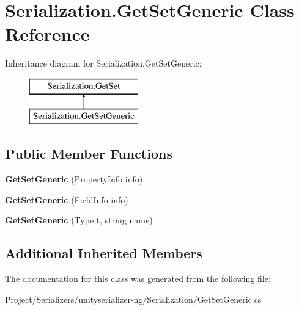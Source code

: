 \hypertarget{class_serialization_1_1_get_set_generic}{}\section{Serialization.\+Get\+Set\+Generic Class Reference}
\label{class_serialization_1_1_get_set_generic}
Inheritance diagram for Serialization.\+Get\+Set\+Generic\+:\begin{figure}[H]
\begin{center}
\leavevmode
\includegraphics[height=2.000000cm]{class_serialization_1_1_get_set_generic}
\end{center}
\end{figure}
\subsection*{Public Member Functions}
\begin{DoxyCompactItemize}
\item 
\mbox{\label{class_serialization_1_1_get_set_generic_a4e6eed71f2c2d5ae431263da5dcd5a68}} 
{\bfseries Get\+Set\+Generic} (Property\+Info info)
\item 
\mbox{\label{class_serialization_1_1_get_set_generic_a03e2851564f498ef4eb251f31ddd1dcb}} 
{\bfseries Get\+Set\+Generic} (Field\+Info info)
\item 
\mbox{\label{class_serialization_1_1_get_set_generic_ac7ba4e9f256af2301924597b9862a841}} 
{\bfseries Get\+Set\+Generic} (Type t, string name)
\end{DoxyCompactItemize}
\subsection*{Additional Inherited Members}


The documentation for this class was generated from the following file\+:\begin{DoxyCompactItemize}
\item 
Project/\+Serializers/unityserializer-\/ng/\+Serialization/Get\+Set\+Generic.\+cs\end{DoxyCompactItemize}
